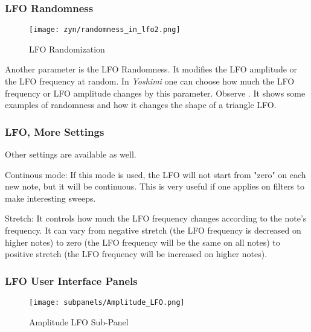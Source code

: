 \subsubsection{LFO Randomness}
\label{subsubsec:lfo_randomness}

\begin{figure}[H]
   \centering 
   \texttt{[image: zyn/randomness\_in\_lfo2.png]}
   \caption[LFO Randomization]{LFO Randomization}
   \label{fig:randomness_in_lfo}
\end{figure}

   Another parameter is the LFO Randomness. It modifies the LFO amplitude or
   the LFO frequency at random. In \textsl{Yoshimi}
   one can choose how much the LFO
   frequency or LFO amplitude changes by this parameter.
   Observe .
   It shows some examples of randomness and how it changes the shape of a
   triangle LFO.

\subsubsection{LFO, More Settings}
\label{subsubsec:lfo_more_settings}

   Other settings are available as well.

   Continous mode: If this mode is used, the LFO will not start from "zero" on
   each new note, but it will be continuous. This is very useful if one
   applies on filters to make interesting sweeps.

   Stretch: It controls how much the LFO frequency changes according to the
   note’s frequency. It can vary from negative stretch (the LFO frequency is
   decreased on higher notes) to zero (the LFO frequency will be the same
   on all notes) to positive stretch (the LFO frequency will be
   increased on higher notes).

\subsubsection{LFO User Interface Panels}
\label{subsubsec:lfo_user_interface_panels}

   \setcounter{ItemCounter}{0}      %

\begin{figure}[H]
   \centering 
   \texttt{[image: subpanels/Amplitude\_LFO.png]}
   \caption[Amplitude LFO Sub-Panel]{Amplitude LFO Sub-Panel}
   \label{fig:amplitude_lfo}
\end{figure}

